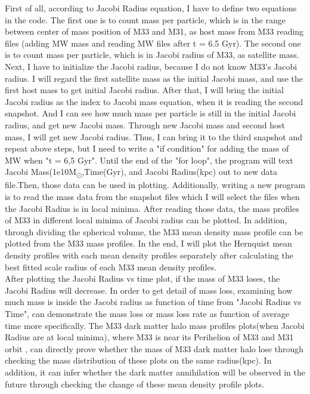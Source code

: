 \documentclass[twocolumn]{aastex63}
\begin{document}
\indent First of all, according to Jacobi Radius equation, I have to define two equations in the code. The first one is to count mass per particle, which is in the range between center of mass position of M33 and M31, as host mass from M33 reading files (adding MW mass and reading MW files after t = 6.5 Gyr). The second one is to count mass per particle, which is in Jacobi radius of M33, as satellite mass. Next, I have to initialize the Jacobi radius, because I do not know M33's Jacobi radius. I will regard the first satellite mass as the initial Jacobi mass, and use the first host mass to get initial Jacobi radius. After that, I will bring the initial Jacobi radius as the index to Jacobi mass equation, when it is reading the second snapshot. And I can see how much mass per particle is still in the initial Jacobi radius, and get new Jacobi mass. Through new Jacobi mass and second host mass, I will get new Jacobi radius. Thus, I can bring it to the third snapshot and repeat above steps, but I need to write a "if condition" for adding the mass of MW when "t = 6,5 Gyr". Until the end of the "for loop", the program will text Jacobi Mass(1e10M\textsubscript{\(\odot\)},Time(Gyr), and Jacobi Radius(kpc) out to new data file.Then, those data can be used in plotting. Additionally, writing a new program is to read the mass data from the snapshot files which I will select the files when the Jacobi Radius is in local minima. After reading those data, the mass profiles of M33 in different local minima of Jacobi radius can be plotted. In addition, through dividing the spherical volume, the M33 mean density mass profile can be plotted from the M33 mass profiles. In the end, I will plot the Hernquist mean density profiles with each mean density profiles separately after calculating the best fitted scale radius of each M33 mean density profiles.\\
\indent After plotting the Jacobi Radius vs time plot, if the mass of M33 loses, the Jacobi Radius will decrease. In order to get detail of mass loss, examining how much mass is inside the Jacobi radius as function of time from "Jacobi Radius vs Time", can demonstrate the mass loss or mass loss rate as function of average time more specifically. The M33 dark matter halo mass profiles plots(when Jacobi Radius are at local minima), where M33 is near its Perihelion of M33 and M31 orbit , can directly prove whether the mass of M33 dark matter halo lose through checking the mass distribution of these plots on the same radius(kpc). In addition, it can infer whether the dark matter annihilation will be observed in the future through checking the change of these mean density profile plots. \\
\end{document}
